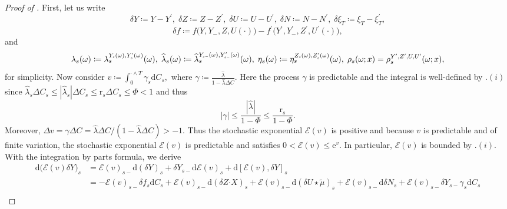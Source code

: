 \documentclass[10pt]{article} %
\newcommand\cE{\mathcal E}
\newcommand{\smalltext}[1]{\text{\fontsize{4}{4}\selectfont$#1$}}
\newcommand{\bcdot}{\boldsymbol{\cdot}}
\newcommand{\1}{\mathbf{1}}
\def\d{\mathrm{d}}
\begin{document}
\begin{proof}[Proof of ]
	First, let us write 
	\begin{equation*}
		\delta Y \coloneqq Y-Y^\prime, \; \delta Z \coloneqq Z-Z^\prime, \; \delta U \coloneqq U - U^\prime, \; \delta N \coloneqq N - N^\prime, \; \delta \xi_T \coloneqq \xi_T - \xi^\prime_T,
	\end{equation*}
	\begin{equation*}
		\delta f \coloneqq f\big(Y,Y_-,Z,U(\cdot)) - f^\prime\big(Y^\prime,Y^\prime_-,Z^\prime,U^\prime(\cdot)\big),
	\end{equation*}
	and
	\begin{equation*}
		\lambda_s(\omega) \coloneqq \lambda^{Y_\smalltext{s}(\omega),Y^\smalltext{\prime}_\smalltext{s}(\omega)}_s(\omega), 
		\; \widehat\lambda_s(\omega) \coloneqq \widehat\lambda^{Y_{\smalltext{s}\smalltext{-}}(\omega),Y^\smalltext{\prime}_{\smalltext{s}\smalltext{-}}(\omega)}_s(\omega), 
		\; \eta_s(\omega) \coloneqq \eta^{Z_\smalltext{s}(\omega),Z^\smalltext{\prime}_\smalltext{s}(\omega)}_s(\omega),
		\; \rho_s(\omega;x) = \rho^{Y^\smalltext{\prime},Z^\smalltext{\prime},U,U^\smalltext{\prime}}_s(\omega;x),
	\end{equation*}
	for simplicity. Now consider $v \coloneqq \int_0^{\cdot \land T} \gamma_s \d C_s,$ where  $\gamma \coloneqq \frac{\widehat\lambda}{1-\widehat\lambda\Delta C}.$ Here the process $\gamma$ is predictable and the integral is well-defined by .$(i)$ since $\widehat\lambda_s \Delta C_s \leq |\widehat\lambda_s| \Delta C_s \leq \mathrm{r}_s\Delta C_s \leq \Phi < 1 $ and thus
	\begin{equation*}
		|\gamma| \leq \frac{|\widehat\lambda|}{1-\Phi} \leq \frac{\mathrm{r}_s}{1-\Phi}.
	\end{equation*}
	Moreover, $\Delta v = \gamma\Delta C = \widehat\lambda\Delta C/(1-\widehat\lambda\Delta C) > -1$. Thus the stochastic exponential $\cE(v)$ is positive and because $v$ is predictable and of finite variation, the stochastic exponential $\cE(v)$ is predictable and satisfies $0 < \cE(v) \leq \mathrm{e}^{v}$. In particular, $\cE(v)$ is bounded by .$(i)$.	With the integration by parts formula, we derive
	\begin{align}\label{eq::ito_comparison}
		\d \big(\cE(v)\delta Y\big)_s &= \cE(v)_{s-}\d (\delta Y)_s + \delta Y_{s-} \d \cE(v)_s + \d [\cE(v),\delta Y]_s \nonumber\\
		&= -\cE(v)_{s-} \delta f_s \d C_s + \cE(v)_{s-} \d(\delta Z \bcdot X)_s + \cE(v)_{s-}\d (\delta U \star\tilde\mu)_s + \cE(v)_{s-}\d \delta N_s + \cE(v)_{s-}\delta Y_{s-}\gamma_s\d C_s \nonumber\\

\end{align}
\end{proof}
\end{document}
